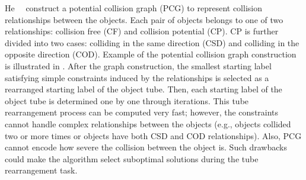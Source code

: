 \documentclass[11pt]{hyu_thesis}
\begin{document}
He~\etal~\cite{He2017} construct a potential collision graph (PCG) to represent collision relationships between the objects. Each pair of objects belongs to one of two relationships: collision free (CF) and collision potential (CP). CP is further divided into two cases: colliding in the same direction (CSD) and colliding in the opposite direction (COD). Example of the potential collision graph construction is illustrated in . After the graph construction, the smallest starting label satisfying simple constraints induced by the relationships is selected as a rearranged starting label of the object tube. Then, each starting label of the object tube is determined one by one through iterations. This tube rearrangement process can be computed very fast; however, the constraints cannot handle complex relationships between the objects (e.g., objects collided two or more times or objects have both CSD and COD relationships). Also, PCG cannot encode how severe the collision between the object is. Such drawbacks could make the algorithm select suboptimal solutions during the tube rearrangement task.
\end{document}

